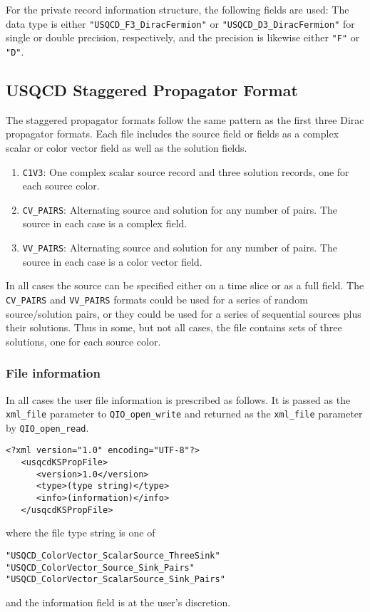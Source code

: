 \documentclass{article}
\begin{document}
For the private record information structure, the following fields are
used: The data type is either \verb|"USQCD_F3_DiracFermion"| or
\verb|"USQCD_D3_DiracFermion"| for single or double precision,
respectively, and the precision is likewise either \verb|"F"| or
\verb|"D"|.

\subsection{USQCD Staggered Propagator Format}

The staggered propagator formats follow the same pattern as the first
three Dirac propagator formats.  Each file includes the source field
or fields as a complex scalar or color vector field as well as the
solution fields.
%
\begin{enumerate}
\item \verb|C1V3|: One complex scalar source record and three
  solution records, one for each source color.
\item \verb|CV_PAIRS|: Alternating source and solution for any number
  of pairs.  The source in each case is a complex field.
\item \verb|VV_PAIRS|: Alternating source and solution for any number
  of pairs.  The source in each case is a color vector field.
\end{enumerate}
%
In all cases the source can be specified either on a time slice or as
a full field.  The \verb|CV_PAIRS| and \verb|VV_PAIRS| formats could
be used for a series of random source/solution pairs, or they could be
used for a series of sequential sources plus their solutions.  Thus in
some, but not all cases, the file contains sets of three solutions,
one for each source color.

\subsubsection{File information}

In all cases the user file information is prescribed as follows.  It
is passed as the \verb|xml_file| parameter to \verb|QIO_open_write| and
returned as the \verb|xml_file| parameter by \verb|QIO_open_read|.

\begin{verbatim}
<?xml version="1.0" encoding="UTF-8"?>
   <usqcdKSPropFile>
      <version>1.0</version>
      <type>(type string)</type>
      <info>(information)</info>
   </usqcdKSPropFile>
\end{verbatim}
%
where the file type string is one of
%
\begin{verbatim}
"USQCD_ColorVector_ScalarSource_ThreeSink"
"USQCD_ColorVector_Source_Sink_Pairs"
"USQCD_ColorVector_ScalarSource_Sink_Pairs"
\end{verbatim}
%
and the information field is at the user's discretion.
\end{document}
